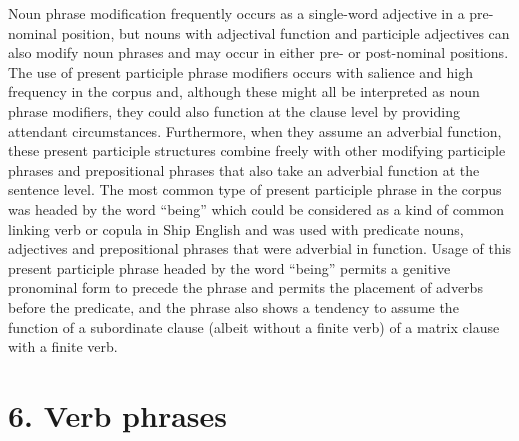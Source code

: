 Noun phrase modification frequently occurs as a single-word adjective in a pre-nominal position, but nouns with adjectival function and participle adjectives can also modify noun phrases and may occur in either pre- or post-nominal positions. The use of present participle phrase modifiers occurs with salience and high frequency in the corpus and, although these might all be interpreted as noun phrase modifiers, they could also function at the clause level by providing attendant circumstances. Furthermore, when they assume an adverbial function, these present participle structures combine freely with other modifying participle phrases and prepositional phrases that also take an adverbial function at the sentence level. The most common type of present participle phrase in the corpus was headed by the word “being” which could be considered as a kind of common linking verb or copula in Ship English and was used with predicate nouns, adjectives and prepositional phrases that were adverbial in function. Usage of this present participle phrase headed by the word “being” permits a genitive pronominal form to precede the phrase and permits the placement of adverbs before the predicate, and the phrase also shows a tendency to assume the function of a subordinate clause (albeit without a finite verb) of a matrix clause with a finite verb. 

\chapter{{6.} {Verb} {phrases}}

